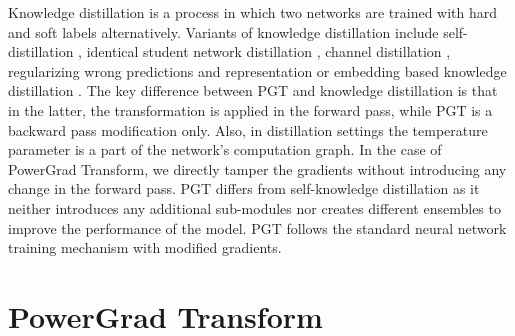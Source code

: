 \documentclass[runningheads]{llncs}
\begin{document}
Knowledge distillation \cite{hinton2015distilling} is a process in which two networks
are trained with hard and soft labels alternatively. Variants of knowledge distillation
include self-distillation \cite{zhang2018deep}, identical student network distillation
\cite{furlanello2018born}, channel distillation \cite{ge2019distilling}, regularizing
wrong predictions \cite{yun2020regularizing} and representation or embedding based
knowledge distillation \cite{yao2018deep}\cite{aguilar2020knowledge}. The key difference between PGT and knowledge
distillation is that in the latter, the transformation is applied in the forward pass,
while PGT is a backward pass modification only. Also, in distillation settings the
temperature parameter is a part of the network's computation graph. In the case of
PowerGrad Transform, we directly tamper the gradients without introducing any change in
the forward pass. PGT differs from self-knowledge distillation as it neither introduces
any additional sub-modules nor creates different ensembles to improve the performance of
the model. PGT follows the standard neural network training mechanism with modified
gradients.

\section{PowerGrad Transform}
\label{sec:Powe}
\end{document}
